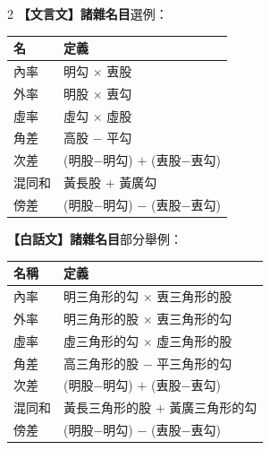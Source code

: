 \documentclass[11pt,a4paper]{article}
\begin{document}
\begin{paracol}{2}
\textbf{【文言文】}\textbf{諸雜名目}選例：

\begin{center}
\begin{tabular}{ll}
\toprule
\textbf{名} & \textbf{定義} \\
\midrule
內率 & 明勾 $\times$ 叀股 \\
外率 & 明股 $\times$ 叀勾 \\
虛率 & 虛勾 $\times$ 虛股 \\
角差 & 高股 $-$ 平勾 \\
次差 & (明股$-$明勾) $+$ (叀股$-$叀勾) \\
混同和 & 黃長股 $+$ 黃廣勾 \\
傍差 & (明股$-$明勾) $-$ (叀股$-$叀勾) \\
\bottomrule
\end{tabular}
\end{center}

\switchcolumn
\textbf{【白話文】}\textbf{諸雜名目}部分舉例：

\begin{center}
\begin{tabular}{ll}
\toprule
\textbf{名稱} & \textbf{定義} \\
\midrule
內率 & 明三角形的勾 $\times$ 叀三角形的股 \\
外率 & 明三角形的股 $\times$ 叀三角形的勾 \\
虛率 & 虛三角形的勾 $\times$ 虛三角形的股 \\
角差 & 高三角形的股 $-$ 平三角形的勾 \\
次差 & (明股$-$明勾) $+$ (叀股$-$叀勾) \\
混同和 & 黃長三角形的股 $+$ 黃廣三角形的勾 \\
傍差 & (明股$-$明勾) $-$ (叀股$-$叀勾) \\
\bottomrule
\end{tabular}
\end{center}
\end{paracol}

\vspace{0.3cm}
\end{document}
